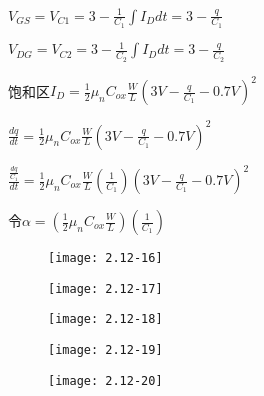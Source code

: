 $V_{GS}=V_{C1}=3-\frac{1}{C_1} \int I_Ddt=3-\frac{q}{C_1}$

$V_{DG}=V_{C2}=3-\frac{1}{C_2} \int I_Ddt=3-\frac{q}{C_2}$












饱和区$I_D=\frac{1}{2}\mu_nC_{ox}\frac{W}{L}(3V-\frac{q}{C_1}-0.7V)^2$




$\frac{dq}{dt}=\frac{1}{2}\mu_nC_{ox}\frac{W}{L}(3V-\frac{q}{C_1}-0.7V)^2$

$\frac{\frac{dq}{C_1}}{dt}=\frac{1}{2}\mu_nC_{ox}\frac{W}{L}(\frac{1}{C_1})(3V-\frac{q}{C_1}-0.7V)^2$

令$\alpha=(\frac{1}{2}\mu_nC_{ox}\frac{W}{L})(\frac{1}{C_1})$

\begin{figure}[H] %
	\begin{minipage}{\linewidth}
		\texttt{[image: 2.12-16]}
	\end{minipage}
\end{figure}

\begin{figure}[H] %
	\begin{minipage}{\linewidth}
		\texttt{[image: 2.12-17]}
	\end{minipage}
\end{figure}

\begin{figure}[H] %
	\begin{minipage}{\linewidth}
		\texttt{[image: 2.12-18]}
	\end{minipage}
\end{figure}

\begin{figure}[H] %
	\begin{minipage}{\linewidth}
		\texttt{[image: 2.12-19]}
	\end{minipage}
\end{figure}

\begin{figure}[H] %
	\begin{minipage}{\linewidth}
		\texttt{[image: 2.12-20]}
	\end{minipage}
\end{figure}

